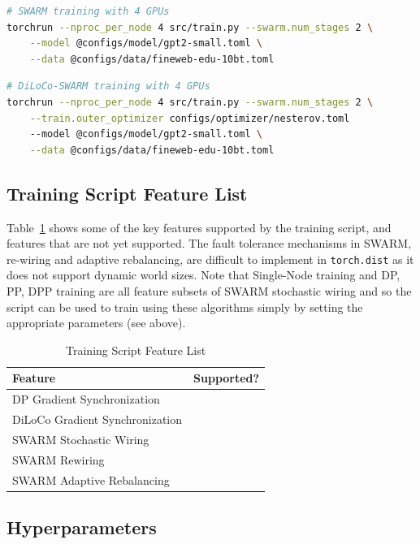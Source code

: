 \documentclass{article}
\begin{document}
\begin{lstlisting}[language=bash]
# SWARM training with 4 GPUs
torchrun --nproc_per_node 4 src/train.py --swarm.num_stages 2 \
    --model @configs/model/gpt2-small.toml \
    --data @configs/data/fineweb-edu-10bt.toml
\end{lstlisting}

\begin{lstlisting}[language=bash]
# DiLoCo-SWARM training with 4 GPUs
torchrun --nproc_per_node 4 src/train.py --swarm.num_stages 2 \
    --train.outer_optimizer configs/optimizer/nesterov.toml
    --model @configs/model/gpt2-small.toml \
    --data @configs/data/fineweb-edu-10bt.toml
\end{lstlisting}

\subsection{Training Script Feature List}

Table~\ref{tab:features} shows some of the key features supported by the
training script, and features that are not yet supported. The fault tolerance
mechanisms in SWARM, re-wiring and adaptive rebalancing, are difficult to
implement in \texttt{torch.dist} as it does not support dynamic world sizes.
Note that Single-Node training and DP, PP, DPP training are all feature subsets
of SWARM stochastic wiring and so the script can be used to train using these
algorithms simply by setting the appropriate parameters (see above).

\begin{table}[ht]
\centering
\begin{tabular}{lc}
\toprule
\textbf{Feature} & \textbf{Supported?} \\ 
\midrule
DP Gradient Synchronization & \checkmark \\
DiLoCo Gradient Synchronization & \checkmark \\
SWARM Stochastic Wiring & \checkmark \\
SWARM Rewiring & \\
SWARM Adaptive Rebalancing & \\
\bottomrule
\end{tabular}
\caption{Training Script Feature List}
\label{tab:features}
\end{table}

\subsection{Hyperparameters}
\end{document}
